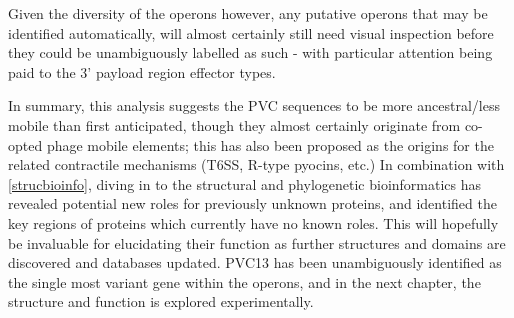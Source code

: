 Given the diversity of the operons however, any putative operons that may be identified automatically, will almost certainly still need visual inspection before they could be unambiguously labelled as such - with particular attention being paid to the 3' payload region effector types.
\newline

In summary, this analysis suggests the PVC sequences to be more ancestral/less mobile than first anticipated, though they almost certainly originate from co-opted phage mobile elements; this has also been proposed as the origins for the related contractile mechanisms (T6SS, R-type pyocins, etc.) In combination with \vref{strucbioinfo}, diving in to the structural and phylogenetic bioinformatics has revealed potential new roles for previously unknown proteins, and identified the key regions of proteins which currently have no known roles. This will hopefully be invaluable for elucidating their function as further structures and domains are discovered and databases updated. PVC13 has been unambiguously identified as the single most variant gene within the operons, and in the next chapter, the structure and function is explored experimentally.
 
 

